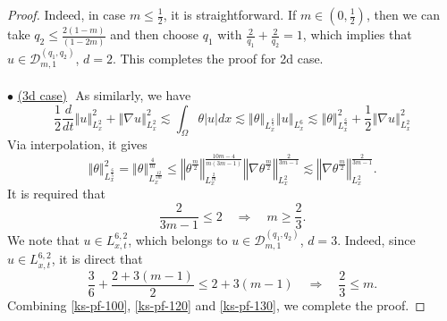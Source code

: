 \documentclass[10pt,a4paper]{amsart}
\newcommand{\abs}[1]{\left| #1 \right|}
\newcommand{\norm}[1]{\left\Vert #1 \right\Vert}
\begin{document}
\begin{proof}
Indeed, in case $m\le \frac{1}{2}$, it is straightforward. If $m \in (0, \frac{1}{2})$, then we can take $q_2 \le \frac{2(1-m)}{(1-2m)}$ and then choose $q_1$ with $\frac{2}{q_1}+\frac{2}{q_2}=1$, which implies that $u\in\mathcal{D}_{m,1}^{(q_1, q_2)}$, $d=2$.
This completes the proof for 2d case.
\\
\\
$\bullet$ \underline{(3d case)}\,\, 
As similarly, we have 
\begin{equation}\label{ks-pf-120}
\frac{1}{2}\frac{d}{dt}\norm{u}_{L^{2}_{x}}^2+\norm{\nabla u}_{L^{2}_{x}}^2\lesssim \int_{\Omega}\theta \abs{u}dx\lesssim \norm{\theta}_{L^{\frac{6}{5}}_{x}}\norm{u}_{L^{6}_{x}} \lesssim \norm{\theta}^{2}_{L^{\frac{6}{5}}_{x}} +\frac{1}{2}\norm{\nabla u}^2_{L^{2}_{x}}
\end{equation}
Via interpolation, it gives
\begin{equation}\label{ks-pf-130}
\norm{\theta}^{2}_{L^{\frac{6}{5}}_{x}}=\norm{\theta}^{\frac{4}{m}}_{L^{\frac{12}{5m}}_{x}}\le \norm{\theta^{\frac{m}{2}}}^{\frac{10m-4}{m(3m-1)}}_{L^{\frac{2}{m}}_{x}}\norm{\nabla \theta^{\frac{m}{2}}}^{\frac{2}{3m-1}}_{L^{2}_{x}}\lesssim \norm{\nabla \theta^{\frac{m}{2}}}^{\frac{2}{3m-1}}_{L^{2}_{x}}.
\end{equation}
It is required that
\[
\frac{2}{3m-1}\le 2 \quad \Longrightarrow \quad  m \geq \frac{2}{3}.
\]
We note that $u\in L^{6,2}_{x,t}$, which belongs to $u\in\mathcal{D}_{m,1}^{(q_1, q_2)}$, $d=3$. Indeed, since $u\in L^{6,2}_{x,t}$, it is direct that 
\[
\frac{3}{6} + \frac{2+3(m-1)}{2} \leq 2+ 3(m-1)\quad\Longrightarrow\quad \frac{2}{3}\leq m.
\]
Combining \eqref{ks-pf-100}, \eqref{ks-pf-120} and \eqref{ks-pf-130}, we complete the proof.
\end{proof}
\end{document}
